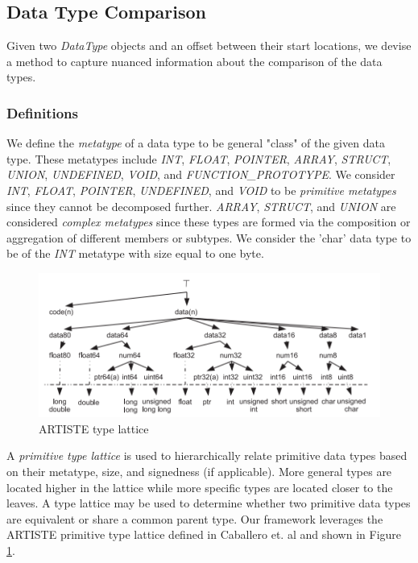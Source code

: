 \subsection{Data Type Comparison}

Given two \emph{DataType} objects and an offset between their start locations, we devise a method to capture nuanced information about the comparison of the data types.

\subsubsection{Definitions}

We define the \emph{metatype} of a data type to be general "class" of the given data type. These metatypes include \emph{INT}, \emph{FLOAT}, \emph{POINTER}, \emph{ARRAY}, \emph{STRUCT}, \emph{UNION}, \emph{UNDEFINED}, \emph{VOID}, and \emph{FUNCTION\_PROTOTYPE}. We consider \emph{INT}, \emph{FLOAT}, \emph{POINTER}, \emph{UNDEFINED}, and \emph{VOID} to be \emph{primitive metatypes} since they cannot be decomposed further. \emph{ARRAY}, \emph{STRUCT}, and \emph{UNION} are considered \emph{complex metatypes} since these types are formed via the composition or aggregation of different members or subtypes. We consider the 'char' data type to be of the \emph{INT} metatype with size equal to one byte.

\begin{figure}
    \centering
    \includegraphics[width=\textwidth]{./figures/ariste-type-lattice.png}
    \caption{ARTISTE type lattice \cite{bib:artiste,bib:type-inference-executables}}
    \label{fig:artiste-type-lattice}
\end{figure}

A \emph{primitive type lattice} \cite{bib:type-inference-executables} is used to hierarchically relate primitive data types based on their metatype, size, and signedness (if applicable). More general types are located higher in the lattice while more specific types are located closer to the leaves. A type lattice may be used to determine whether two primitive data types are equivalent or share a common parent type. Our framework leverages the ARTISTE primitive type lattice defined in Caballero et. al \cite{bib:artiste} and shown in Figure \ref{fig:artiste-type-lattice}.

